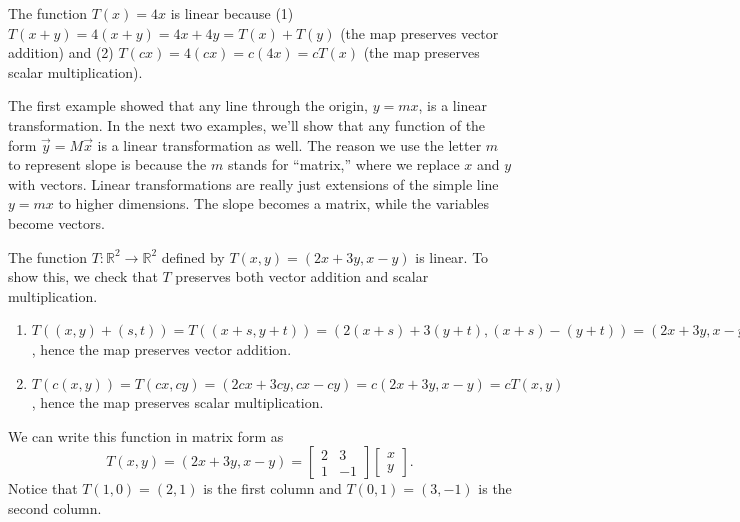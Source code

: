 \begin{example}
The function $T(x)=4x$ is linear because (1) $T(x+y) = 4(x+y) = 4x+4y = T(x)+T(y)$ (the map preserves vector addition) and (2) $T(cx)=4(cx)=c(4x)=cT(x)$ (the map preserves scalar multiplication).
\end{example}

The first example showed that any line through the origin, $y=mx$, is a linear transformation. In the next two examples, we'll show that any function of the form $\vec y = M\vec x$ is a linear transformation as well.  The reason we use the letter $m$ to represent slope is because the $m$ stands for ``matrix,'' where we replace $x$ and $y$ with vectors. Linear transformations are really just extensions of the simple line $y=mx$ to higher dimensions. The slope becomes a matrix, while the variables become vectors.

\begin{example} \label{ltex matrix1}
The function $T:\mathbb{R}^2\to \mathbb{R}^2$ defined by $T(x,y)=(2x+3y,x-y)$ is linear.  To show this, we check that $T$ preserves both vector addition and scalar multiplication.
\begin{enumerate}
	\item $T((x,y)+(s,t)) = T((x+s,y+t))=(2(x+s)+3(y+t),(x+s)-(y+t)) = (2x+3y,x-y)+ (2s+3t,s-t) = T(x,y)+T(s,t)$, hence the map preserves vector addition. 
	\item $T(c(x,y))= T(cx,cy) = (2cx+3cy,cx-cy)=c(2x+3y,x-y)=cT(x,y)$, hence the map preserves scalar multiplication.
\end{enumerate}
 We can write this function in matrix form as 
	$$T(x,y)=(2x+3y,x-y)=\begin{bmatrix}2&3\\ 1&-1\end{bmatrix}\begin{bmatrix}x\\y\end{bmatrix}.$$ 	
	Notice that $T(1,0)=(2,1)$ is the first column and $T(0,1)=(3,-1)$ is the second column.

\end{example}

